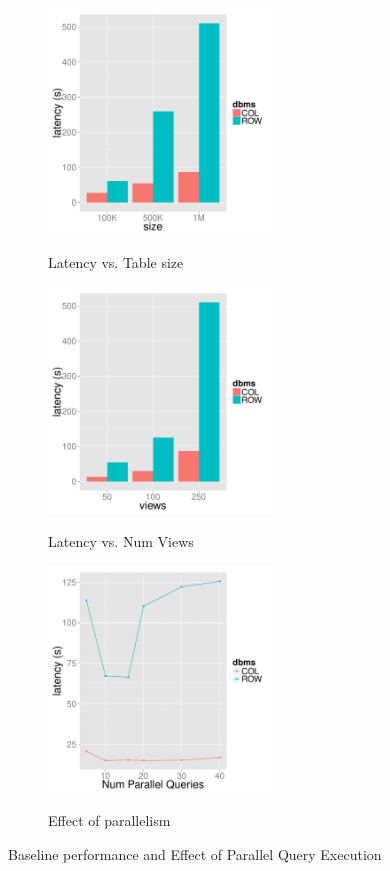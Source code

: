 \begin{figure}[t]
	\centering
	\begin{subfigure}{0.33\linewidth}
		{\includegraphics[width=6cm] {Images/baselines_by_size.pdf}}
		\caption{Latency vs. Table size}
		\label{fig:baseline_size}
	\end{subfigure}
	\begin{subfigure}{0.33\linewidth}
		\centering
		{\includegraphics[width=6cm] {Images/baselines_by_views.pdf}}
		\caption{Latency vs. Num Views}
		\label{fig:baseline_views}
	\end{subfigure}
	\begin{subfigure}{0.33\linewidth}
		\centering
		{\includegraphics[width=6cm] {Images/parallel_noop.pdf}}
		\caption{Effect of parallelism}
		\label{fig:parallelism}
	\end{subfigure}
	\caption{Baseline performance and Effect of Parallel Query Execution }
	\label{fig:bank_perf}
\end{figure}

